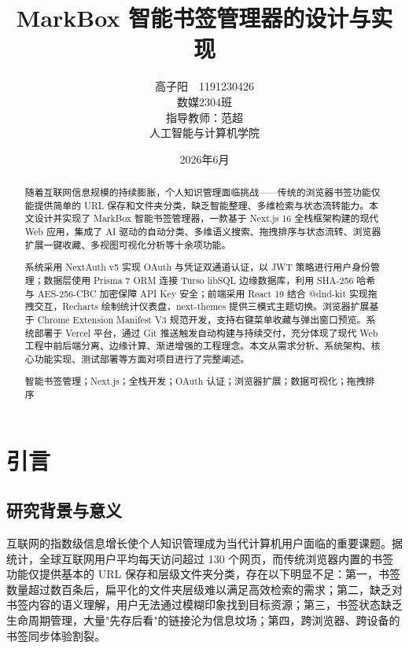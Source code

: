 \documentclass[a4paper,12pt]{ctexart}
\title{{\bfseries MarkBox 智能书签管理器的设计与实现}}
\author{
  高子阳\ \ 1191230426 \\[4pt]
  数媒2304班 \\[4pt]
  指导教师：范超 \\[4pt]
  人工智能与计算机学院
}
\date{2026年6月}
\begin{document}
\maketitle
\thispagestyle{fancy}

\begin{abstract}
\noindent
随着互联网信息规模的持续膨胀，个人知识管理面临挑战——传统的浏览器书签功能仅能提供简单的 URL 保存和文件夹分类，缺乏智能整理、多维检索与状态流转能力。本文设计并实现了 MarkBox 智能书签管理器，一款基于 Next.js 16 全栈框架构建的现代 Web 应用，集成了 AI 驱动的自动分类、多维语义搜索、拖拽排序与状态流转、浏览器扩展一键收藏、多视图可视化分析等十余项功能。

系统采用 NextAuth v5 实现 OAuth 与凭证双通道认证，以 JWT 策略进行用户身份管理；数据层使用 Prisma 7 ORM 连接 Turso libSQL 边缘数据库，利用 SHA-256 哈希与 AES-256-CBC 加密保障 API Key 安全；前端采用 React 19 结合 @dnd-kit 实现拖拽交互，Recharts 绘制统计仪表盘，next-themes 提供三模式主题切换。浏览器扩展基于 Chrome Extension Manifest V3 规范开发，支持右键菜单收藏与弹出窗口预览。系统部署于 Vercel 平台，通过 Git 推送触发自动构建与持续交付，充分体现了现代 Web 工程中前后端分离、边缘计算、渐进增强的工程理念。本文从需求分析、系统架构、核心功能实现、测试部署等方面对项目进行了完整阐述。

\vspace{6pt}
智能书签管理；Next.js；全栈开发；OAuth 认证；浏览器扩展；数据可视化；拖拽排序
\end{abstract}

\newpage

\section{引言}

\subsection{研究背景与意义}

互联网的指数级信息增长使个人知识管理成为当代计算机用户面临的重要课题。据统计，全球互联网用户平均每天访问超过 130 个网页，而传统浏览器内置的书签功能仅提供基本的 URL 保存和层级文件夹分类，存在以下明显不足：第一，书签数量超过数百条后，扁平化的文件夹层级难以满足高效检索的需求；第二，缺乏对书签内容的语义理解，用户无法通过模糊印象找到目标资源；第三，书签状态缺乏生命周期管理，大量"先存后看"的链接沦为信息坟场；第四，跨浏览器、跨设备的书签同步体验割裂。
\end{document}
